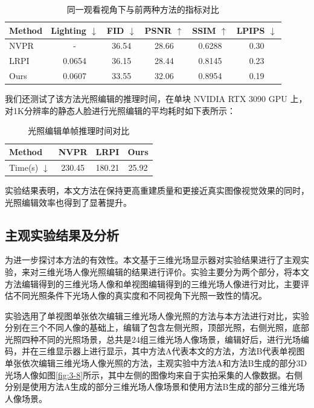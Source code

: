 \begin{table}[htbp]
  \centering
  \caption{同一观看视角下与前两种方法的指标对比}
  \label{tab:3-1}
  \small
  \begin{tabular}{lccccc}
    \toprule
    Method & Lighting $\downarrow$ & FID $\downarrow$ & PSNR $\uparrow$ & SSIM $\uparrow$ & LPIPS $\downarrow$ \\
    \midrule
    NVPR  & -                    & 36.54           & 28.66           & 0.6288          & 0.30             \\
    LRPI  & 0.0654               & 36.15           & 28.44           & 0.8145          & 0.23             \\
    Ours  & 0.0607               & 33.55           & 32.06           & 0.8954          & 0.19             \\
    \bottomrule
  \end{tabular}
\end{table}

我们还测试了该方法光照编辑的推理时间，在单块 NVIDIA RTX 3090 GPU 上，对1K分辨率的静态人脸进行光照编辑的平均耗时如下表所示：

\begin{table}[htbp]
  \centering
  \caption{光照编辑单帧推理时间对比}
  \label{tab:inference_time_3090}
  \begin{tabular}{lccc}
    \toprule
    Method & NVPR    & LRPI    & Ours     \\
    \midrule
    Time(s) $\downarrow$ & 230.45  & 180.21  & 25.92    \\
    \bottomrule
  \end{tabular}
\end{table}

实验结果表明，本文方法在保持更高重建质量和更接近真实图像视觉效果的同时，光照编辑效率也得到了显著提升。

\subsection{主观实验结果及分析}

为进一步探讨本方法的有效性。本文基于三维光场显示器对实验结果进行了主观实验，来对三维光场人像光照编辑的结果进行评价。实验主要分为两个部分，将本文方法编辑得到的三维光场人像和单视图编辑得到的三维光场人像进行对比，主要评估不同光照条件下光场人像的真实度和不同视角下光照一致性的情况。

实验选用了单视图单张依次编辑三维光场人像光照的方法与本方法进行对比，实验分别在三个不同人像的基础上，编辑了包含左侧光照，顶部光照，右侧光照，底部光照四种不同的光照场景，总共是24组三维光场人像场景，编辑好后，进行光场编码，并在三维显示器上进行显示，其中方法A代表本文的方法，方法B代表单视图单张依次编辑三维光场人像光照的方法，主观实验中方法A和方法B生成的部分3D光场人像如图\ref{fig:3-8}所示，其中左侧的图像均来自于实拍采集的人像数据。右侧分别是使用方法A生成的部分三维光场人像场景和使用方法B生成的部分三维光场人像场景。


